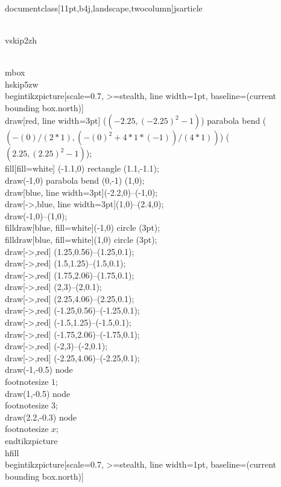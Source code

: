 \\documentclass[11pt,b4j,landscape,twocolumn]{jsarticle}
\begin{document}
\\vskip2zh

\\mbox{}\\hskip5zw
\\begin{tikzpicture}[scale=0.7, >=stealth, line width=1pt, baseline=(current bounding box.north)]
\\draw[red, line width=3pt] ($ (-2.25,{(-2.25)^2-1}) $) parabola bend ($ ({-(0)/(2*1)},{(-(0)^2+4*1*(-1))/(4*1)}) $) ($ (2.25,{(2.25)^2-1}) $);
\\fill[fill=white] (-1.1,0) rectangle (1.1,-1.1);
\\draw(-1,0) parabola bend (0,-1) (1,0);
\\draw[blue, line width=3pt](-2.2,0)--(-1,0);
\\draw[->,blue, line width=3pt](1,0)--(2.4,0);
\\draw(-1,0)--(1,0);
\\filldraw[blue, fill=white](-1,0) circle (3pt);
\\filldraw[blue, fill=white](1,0) circle (3pt);
\\draw[->,red] (1.25,0.56)--(1.25,0.1);
\\draw[->,red] (1.5,1.25)--(1.5,0.1);
\\draw[->,red] (1.75,2.06)--(1.75,0.1);
\\draw[->,red] (2,3)--(2,0.1);
\\draw[->,red] (2.25,4.06)--(2.25,0.1);
\\draw[->,red] (-1.25,0.56)--(-1.25,0.1);
\\draw[->,red] (-1.5,1.25)--(-1.5,0.1);
\\draw[->,red] (-1.75,2.06)--(-1.75,0.1);
\\draw[->,red] (-2,3)--(-2,0.1);
\\draw[->,red] (-2.25,4.06)--(-2.25,0.1);
\\draw(-1,-0.5) node{\\footnotesize $1$};
\\draw(1,-0.5) node{\\footnotesize $3$};
\\draw(2.2,-0.3) node{\\footnotesize $x$};
\\end{tikzpicture}
\\hfill
\\begin{tikzpicture}[scale=0.7, >=stealth, line width=1pt, baseline=(current bounding box.north)]
\end{document}
